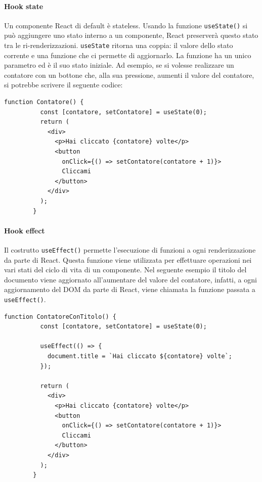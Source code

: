\documentclass[a4paper]{article}
\begin{document}
      \paragraph{Hook state}
      Un componente React di default è stateless. Usando la funzione \verb|useState()| si può
      aggiungere uno stato interno a un componente, React preserverà questo stato tra le ri-renderizzazioni.
      \verb|useState| ritorna una coppia: il valore dello stato corrente e una funzione che ci permette di aggiornarlo.
      La funzione ha un unico parametro ed è il suo stato iniziale. Ad esempio, se si volesse realizzare un contatore con un bottone che, alla sua pressione,
      aumenti il valore del contatore, si potrebbe scrivere il seguente codice:
      \begin{lstlisting}[style=ES6, title={Esempio contatore con stato interno}]
        function Contatore() {
          const [contatore, setContatore] = useState(0);
          return (
            <div>
              <p>Hai cliccato {contatore} volte</p>
              <button 
                onClick={() => setContatore(contatore + 1)}>
                Cliccami
              </button>
            </div>
          );
        }\end{lstlisting}

      \paragraph{Hook effect}
      Il costrutto \verb|useEffect()| permette l'esecuzione di funzioni a ogni renderizzazione da parte di React.
      Questa funzione viene utilizzata per effettuare operazioni nei vari stati del ciclo di vita di un componente.
      \newline
      Nel seguente esempio il titolo del documento viene aggiornato all'aumentare del valore del contatore, infatti, 
      a ogni aggiornamento del DOM da parte di React, viene chiamata la funzione passata a \verb|useEffect()|.
      \begin{lstlisting}[style=ES6, title={Esempio uso di useEffect()}]
        function ContatoreConTitolo() {
          const [contatore, setContatore] = useState(0);

          useEffect(() => {
            document.title = `Hai cliccato ${contatore} volte`;
          });

          return (
            <div>
              <p>Hai cliccato {contatore} volte</p>
              <button
                onClick={() => setContatore(contatore + 1)}>
                Cliccami
              </button>
            </div>
          );
        }\end{lstlisting}
\end{document}
